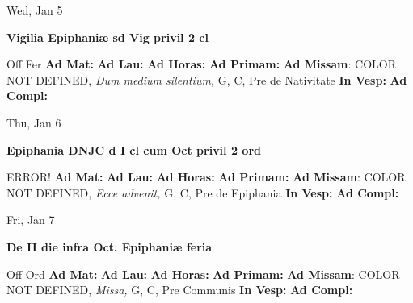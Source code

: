 \documentclass[10pt]{memoir}
\begin{document}
\begin{center}
\begin{minipage}{3.5in}
\vspace{2em}
\begin{center}Wed, Jan 5
\end{center}
\textbf{ \large Vigilia Epiphaniæ
\textnormal{\normalsize sd Vig privil 2 cl}}

\begin{justify}Off Fer
\textbf{Ad Mat: }
\textbf{Ad Lau: }
\textbf{Ad Horas: }
\textbf{Ad Primam: }\textbf{Ad Missam}: COLOR NOT DEFINED, \textit{Dum medium silentium,} G, C, Pre de Nativitate
\textbf{In Vesp: }
\textbf{Ad Compl: }
\end{justify}
\end{minipage}
\end{center}

\begin{center}
\begin{minipage}{3.5in}
\vspace{2em}
\begin{center}Thu, Jan 6
\end{center}
\textbf{ \large Epiphania DNJC
\textnormal{\normalsize d I cl cum Oct privil 2 ord}}

\begin{justify}ERROR!
\textbf{Ad Mat: }
\textbf{Ad Lau: }
\textbf{Ad Horas: }
\textbf{Ad Primam: }\textbf{Ad Missam}: COLOR NOT DEFINED, \textit{Ecce advenit,} G, C, Pre de Epiphania
\textbf{In Vesp: }
\textbf{Ad Compl: }
\end{justify}
\end{minipage}
\end{center}

\begin{center}
\begin{minipage}{3.5in}
\vspace{2em}
\begin{center}Fri, Jan 7
\end{center}
\textbf{ \large De II die infra Oct. Epiphaniæ
\textnormal{\normalsize feria}}

\begin{justify}Off Ord
\textbf{Ad Mat: }
\textbf{Ad Lau: }
\textbf{Ad Horas: }
\textbf{Ad Primam: }\textbf{Ad Missam}: COLOR NOT DEFINED, \textit{Missa,} G, C, Pre Communis
\textbf{In Vesp: }
\textbf{Ad Compl: }
\end{justify}
\end{minipage}
\end{center}
\end{document}
